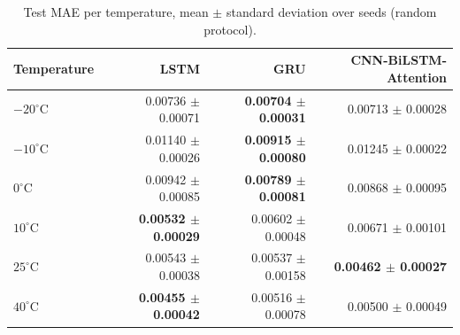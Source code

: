 \begin{table}[t]
\centering
\caption{Test MAE per temperature, mean $\pm$ standard deviation over seeds (random protocol).}
\label{tab:mae_temperature_seeds_random}
\begin{tabular}{lrrr}
\toprule
Temperature & LSTM & GRU & CNN-BiLSTM-Attention \\
\midrule
$-20^{\circ}$C & 0.00736 $\pm$ 0.00071 & \textbf{0.00704 $\pm$ 0.00031} & 0.00713 $\pm$ 0.00028 \\
$-10^{\circ}$C & 0.01140 $\pm$ 0.00026 & \textbf{0.00915 $\pm$ 0.00080} & 0.01245 $\pm$ 0.00022 \\
$0^{\circ}$C & 0.00942 $\pm$ 0.00085 & \textbf{0.00789 $\pm$ 0.00081} & 0.00868 $\pm$ 0.00095 \\
$10^{\circ}$C & \textbf{0.00532 $\pm$ 0.00029} & 0.00602 $\pm$ 0.00048 & 0.00671 $\pm$ 0.00101 \\
$25^{\circ}$C & 0.00543 $\pm$ 0.00038 & 0.00537 $\pm$ 0.00158 & \textbf{0.00462 $\pm$ 0.00027} \\
$40^{\circ}$C & \textbf{0.00455 $\pm$ 0.00042} & 0.00516 $\pm$ 0.00078 & 0.00500 $\pm$ 0.00049 \\
\bottomrule
\end{tabular}
\end{table}